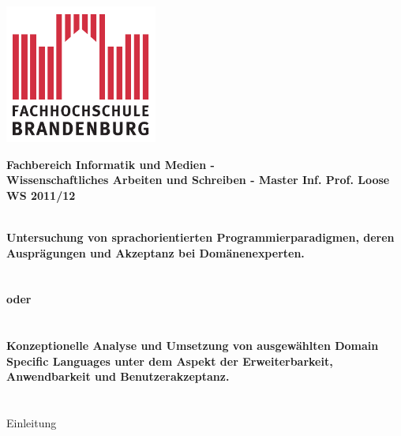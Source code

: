 \titlepage

\begin{center}
\includegraphics[width=5cm]{pics/FH-Logo}\vspace{0.5cm}

\par\end{center}

\noindent \begin{center}
\textsf{\textbf{\Large Fachbereich Informatik und Medien - \\
Wissenschaftliches Arbeiten und Schreiben - Master Inf. Prof. Loose
WS 2011/12}}\\ \textsf{\large }\\
\vspace{1cm}

\par\end{center}

\begin{center}
\textsf{\textbf{\huge Untersuchung von sprachorientierten
Programmierparadigmen, deren Ausprägungen und Akzeptanz bei Domänenexperten.\\
}}\textsf{}\\ \textsf{}\\
 
\textsf{\textbf{\huge oder\\
}}\textsf{}\\ \textsf{}\\
 
\textsf{\textbf{\huge Konzeptionelle Analyse und Umsetzung von ausgewählten
Domain Specific Languages unter dem Aspekt der Erweiterbarkeit, Anwendbarkeit
und Benutzerakzeptanz.\\ }}\textsf{}\\ \textsf{}\\

\textsf{\Large Einleitung}


\par\end{center}{\Large \par}

